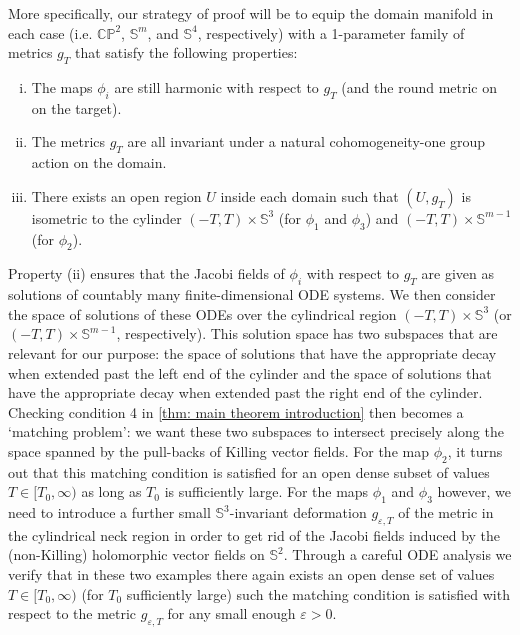 \documentclass{article}
\numberwithin{equation}{section}        %
\theoremstyle{bfnote}
\theoremstyle{definition}
\theoremstyle{bfremark}
\newcommand{\Sp}{\mathbb{S}}                %
\begin{document}
More specifically, our strategy of proof will be to equip the domain manifold in each case (i.e. $\mathbb{CP}^2$, $\Sp^m$, and $\Sp^4$, respectively) with a 1-parameter family of metrics $g_T$ that satisfy the following properties:
\begin{enumerate}[(i)]
    \item The maps $\phi_i$ are still harmonic with respect to $g_T$ (and the round metric on on the target).
    \item The metrics $g_T$ are all invariant under a natural cohomogeneity-one group action on the domain.
    \item There exists an open region $U$ inside each domain such that $(U,g_T)$ is isometric to the cylinder $(-T,T) \times \Sp^3$ (for $\phi_1$ and $\phi_3$) and $(-T,T) \times \Sp^{m-1}$ (for $\phi_2$). 
\end{enumerate}
Property (ii) ensures that the Jacobi fields of $\phi_i$ with respect to $g_T$ are given as solutions of countably many finite-dimensional ODE systems. We then consider the space of solutions of these ODEs over the cylindrical region $(-T,T) \times \Sp^3$ (or $(-T,T) \times \Sp^{m-1}$, respectively). This solution space has two subspaces that are relevant for our purpose: the space of solutions that have the appropriate decay when extended past the left end of the cylinder and the space of solutions that have the appropriate decay when extended past the right end of the cylinder. Checking condition 4 in \cref{thm: main theorem introduction} then becomes a `matching problem': we want these two subspaces to intersect precisely along the space spanned by the pull-backs of Killing vector fields. For the map $\phi_2$, it turns out that this matching condition is satisfied for an open dense subset of values $T \in [T_0,\infty)$ as long as $T_0$ is sufficiently large. For the maps $\phi_1$ and $\phi_3$ however, we need to introduce a further small $\Sp^3$-invariant deformation $g_{\varepsilon,T}$ of the metric in the cylindrical neck region in order to get rid of the Jacobi fields induced by the (non-Killing) holomorphic vector fields on $\Sp^2$. Through a careful ODE analysis we verify that in these two examples there again exists an open dense set of values $T \in [T_0,\infty)$ (for $T_0$ sufficiently large) such the matching condition is satisfied with respect to the metric $g_{\varepsilon,T}$ for any small enough $\varepsilon > 0$.
\end{document}
